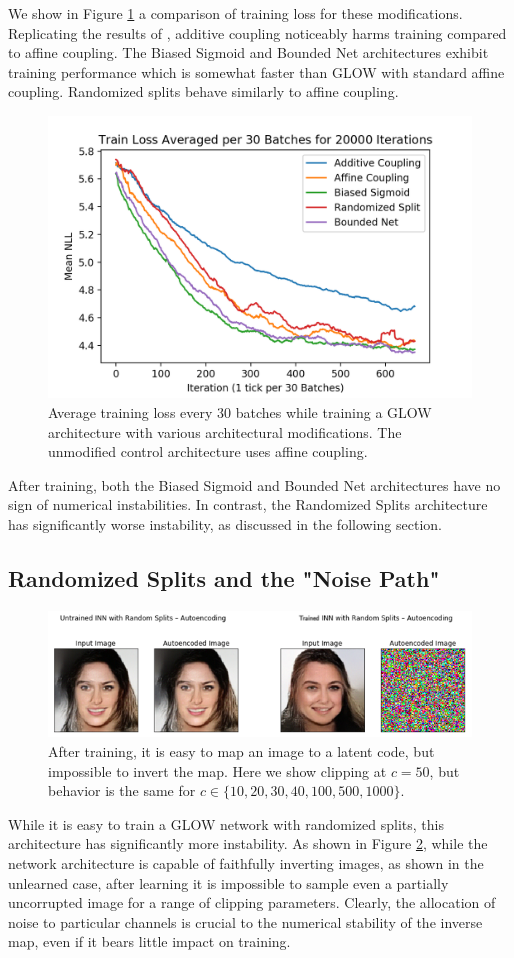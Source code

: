 We show in Figure \ref{fig:train_performance} a comparison of training loss for these modifications. Replicating the results of \cite{kingma2018glow}, additive coupling noticeably harms training compared to affine coupling. The Biased Sigmoid and Bounded Net architectures exhibit training performance which is somewhat faster than GLOW with standard affine coupling. Randomized splits behave similarly to affine coupling.
\begin{figure}[h]
    \centering
    \includegraphics[width=0.6\linewidth]{figures/train_loss.png}
    \caption{Average training loss every $30$ batches while training a GLOW architecture with various architectural modifications. The unmodified control architecture uses affine coupling.}
    \label{fig:train_performance}
\end{figure}

After training, both the Biased Sigmoid and Bounded Net architectures have no sign of numerical instabilities. In contrast, the Randomized Splits architecture has significantly worse instability, as discussed in the following section.

\subsection{Randomized Splits and the "Noise Path"}

\begin{figure}
    \centering
    \includegraphics[width=0.8\linewidth]{figures/autoencode.png}
    \caption{After training, it is easy to map an image to a latent code, but impossible to invert the map. Here we show clipping at $c=50$, but behavior is the same for $c \in \{10, 20, 30, 40, 100, 500, 1000\}$.}
    \label{fig:autoencode}
\end{figure}
While it is easy to train a GLOW network with randomized splits, this architecture has significantly more instability. As shown in Figure \ref{fig:autoencode}, while the network architecture is capable of faithfully inverting images, as shown in the unlearned case, after learning it is impossible to sample even a partially uncorrupted image for a range of clipping parameters. Clearly, the allocation of noise to particular channels is crucial to the numerical stability of the inverse map, even if it bears little impact on training.


